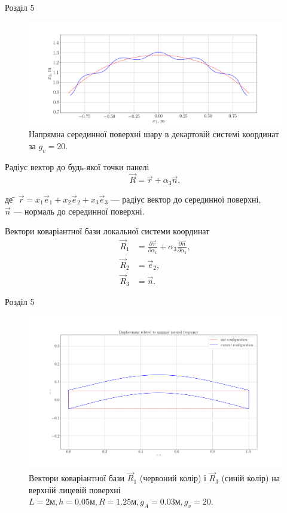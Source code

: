 \documentclass[8pt]{beamer}
\numberwithin{figure}{section}
\numberwithin{equation}{section}
\numberwithin{table}{section}
\begin{document}
\begin{frame}{Розділ 5}
\begin{figure}
	\includegraphics[scale=0.2]{pic/cor_geom.png}
		\caption{Напрямна серединної поверхні шару в декартовій системі координат за $g_v=20$.}
\end{figure}

Радіус вектор до будь-якої точки панелі
\begin{equation}
\vec{R}=\vec{r}+\alpha_3\vec{n},
\end{equation}
\begin{tabbing}
де \= $\vec{r} = x_1\vec{e}_1+x_2\vec{e}_2+x_3\vec{e}_3$ --- радіус вектор до серединної поверхні,\\
\> $\vec{n}$ --- нормаль до серединної поверхні.
\end{tabbing}

Вектори коваріантної бази локальної системи координат
\begin{align}
\vec{R}_1&=\frac{\partial \vec{r}}{\partial \alpha_1}+\alpha_3\frac{\partial \vec{n}}{\partial \alpha_1},\\
\vec{R}_2 &= \vec{e}_2,\\
\vec{R}_3 &= \vec{n}.
\end{align}

\end{frame}

\begin{frame}{Розділ 5}
\begin{figure}
	\includegraphics[scale=0.2]{pic/cor_R1R3.png}
		\caption{Вектори коваріантної бази $\vec{R}_1$ (червоний колір) і $\vec{R}_3$ (синій колір) на верхній лицевій поверхні $L=2\text{м}, h=0.05\text{м},R=1.25\text{м},g_A=0.03\text{м}, g_v=20$.}
\end{figure}

\end{frame}
\end{document}
